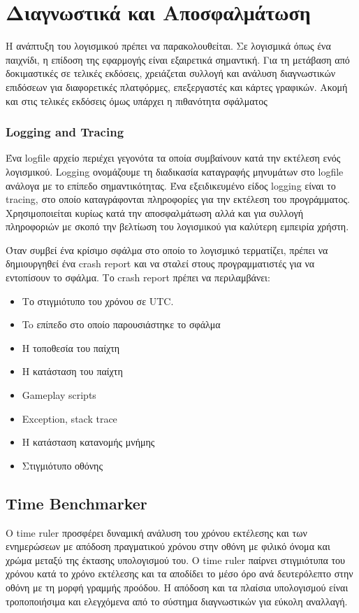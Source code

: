 \chapter{Διαγνωστικά και Αποσφαλμάτωση}
Η ανάπτυξη του λογισμικού πρέπει να παρακολουθείται. Σε λογισμικά όπως ένα παιχνίδι, η επίδοση της εφαρμογής είναι εξαιρετικά σημαντική. Για τη μετάβαση από δοκιμαστικές σε τελικές εκδόσεις, χρειάζεται συλλογή και ανάλυση διαγνωστικών επιδόσεων για διαφορετικές πλατφόρμες, επεξεργαστές και κάρτες γραφικών. Ακομή και στις τελικές εκδόσεις όμως υπάρχει η πιθανότητα σφάλματος

\subsection{Logging and Tracing}
Ένα logfile αρχείο περιέχει γεγονότα τα οποία συμβαίνουν κατά την εκτέλεση ενός λογισμικού. Logging ονομάζουμε τη διαδικασία καταγραφής μηνυμάτων στο logfile ανάλογα με το επίπεδο σημαντικότητας. Ένα εξειδικευμένο είδος logging είναι το tracing, στο οποίο καταγράφονται πληροφορίες για την εκτέλεση του προγράμματος. Χρησιμοποιείται κυρίως κατά την αποσφαλμάτωση αλλά και για συλλογή πληροφοριών με σκοπό την βελτίωση του λογισμικού για καλύτερη εμπειρία χρήστη.

Όταν συμβεί ένα κρίσιμο σφάλμα στο οποίο το λογισμικό τερματίζει, πρέπει να δημιουργηθεί ένα crash report και να σταλεί στους προγραμματιστές για να  εντοπίσουν το σφάλμα.
Το crash report πρέπει να περιλαμβάνει:
\begin{itemize}
 \item Το στιγμιότυπο του χρόνου σε UTC.
 \item To επίπεδο στο οποίο παρουσιάστηκε το σφάλμα
 \item Η τοποθεσία του παίχτη
 \item Η κατάσταση του παίχτη
 \item Gameplay scripts
 \item Exception, stack trace
 \item Η κατάσταση κατανομής μνήμης
 \item Στιγμιότυπο οθόνης
\end{itemize}

\section{Time Benchmarker}
Ο time ruler προσφέρει δυναμική ανάλυση του χρόνου εκτέλεσης και των ενημερώσεων με απόδοση πραγματικού χρόνου στην οθόνη με φιλικό όνομα και χρώμα μεταξύ της έκτασης υπολογισμού του.  O time ruler παίρνει στιγμιότυπα του χρόνου κατά το χρόνο εκτέλεσης και τα αποδίδει το μέσο όρο ανά δευτερόλεπτο στην οθόνη με τη μορφή γραμμής προόδου.
Η απόδοση και τα πλαίσια υπολογισμού είναι τροποποιήσιμα και ελεγχόμενα από το σύστημα διαγνωστικών για εύκολη αναλλαγή.

